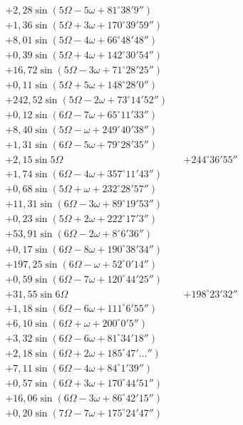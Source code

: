 \documentclass[10pt,a4paper]{article}
\begin{document}
\begin{align*}
&+ 2,28 \sin(5\Omega - 5\omega + 81^{\circ}38'9'') \\
&+ 1,36 \sin(5\Omega + 3\omega + 170^{\circ}39'59'') \\
&+ 8,01 \sin(5\Omega - 4\omega + 66^{\circ}48'48'') \\
&+ 0,39 \sin(5\Omega + 4\omega + 142^{\circ}30'54'') \\
&+ 16,72 \sin(5\Omega - 3\omega + 71^{\circ}28'25'') \\
&+ 0,11 \sin(5\Omega + 5\omega + 148^{\circ}28'0'') \\
&+ 242,52 \sin(5\Omega - 2\omega + 73^{\circ}14'52'') \\
&+ 0,12 \sin(6\Omega - 7\omega + 65^{\circ}11'33'') \\
&+ 8,40 \sin(5\Omega - \omega + 249^{\circ}40'38'') \\
&+ 1,31 \sin(6\Omega - 5\omega + 79^{\circ}28'35'') \\
&+ 2,15 \sin 5\Omega &&+ 244^{\circ}36'55'' \\
&+ 1,74 \sin(6\Omega - 4\omega + 357^{\circ}11'43'') \\
&+ 0,68 \sin(5\Omega + \omega + 232^{\circ}28'57'') \\
&+ 11,31 \sin(6\Omega - 3\omega + 89^{\circ}19'53'') \\
&+ 0,23 \sin(5\Omega + 2\omega + 222^{\circ}17'3'') \\
&+ 53,91 \sin(6\Omega - 2\omega + 8^{\circ}6'36'') \\
&+ 0,17 \sin(6\Omega - 8\omega + 190^{\circ}38'34'') \\
&+ 197,25 \sin(6\Omega - \omega + 52^{\circ}0'14'') \\
&+ 0,59 \sin(6\Omega - 7\omega + 120^{\circ}44'25'') \\
&+ 31,55 \sin 6\Omega &&+ 198^{\circ}23'32'' \\
&+ 1,18 \sin(6\Omega - 6\omega + 111^{\circ}6'55'') \\
&+ 6,10 \sin(6\Omega + \omega + 200^{\circ}0'5'') \\
&+ 3,32 \sin(6\Omega - 6\omega + 81^{\circ}34'18'') \\
&+ 2,18 \sin(6\Omega + 2\omega + 185^{\circ}47'\ldots'') \\
&+ 7,11 \sin(6\Omega - 4\omega + 84^{\circ}1'39'') \\
&+ 0,57 \sin(6\Omega + 3\omega + 170^{\circ}44'51'') \\
&+ 16,06 \sin(6\Omega - 3\omega + 86^{\circ}42'15'') \\
&+ 0,20 \sin(7\Omega - 7\omega + 175^{\circ}24'47'') \\

\end{align*}
\end{document}
